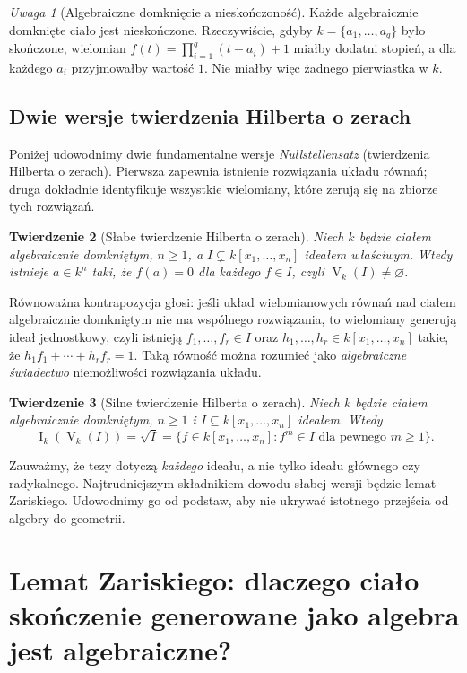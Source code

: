 \documentclass[11pt,a4paper,openany]{report}
\numberwithin{equation}{section}
\theoremstyle{plain}
\newtheorem{twierdzenie}{Twierdzenie}[section]
\theoremstyle{definition}
\theoremstyle{remark}
\newtheorem{uwaga}[twierdzenie]{Uwaga}
\newcommand{\V}{\operatorname V}
\newcommand{\I}{\operatorname I}
\begin{document}
\begin{uwaga}[Algebraiczne domknięcie a nieskończoność]
Każde algebraicznie domknięte ciało jest nieskończone.
Rzeczywiście, gdyby $k=\{a_1,\dots,a_q\}$ było skończone,
wielomian $f(t)=\prod_{i=1}^q(t-a_i)+1$ miałby dodatni stopień,
a dla każdego $a_i$ przyjmowałby wartość $1$.
Nie miałby więc żadnego pierwiastka w $k$.
\end{uwaga}

\subsection{Dwie wersje twierdzenia Hilberta o zerach}

Poniżej udowodnimy dwie fundamentalne wersje
\emph{Nullstellensatz} (twierdzenia Hilberta o zerach).
Pierwsza zapewnia istnienie rozwiązania układu równań;
druga dokładnie identyfikuje wszystkie wielomiany, które
zerują się na zbiorze tych rozwiązań.

\begin{twierdzenie}[Słabe twierdzenie Hilberta o zerach]
\label{tw:weak-NS}
Niech $k$ będzie ciałem algebraicznie domkniętym,
$n\ge1$, a $I\subsetneq k[x_1,\dots,x_n]$ ideałem właściwym.
Wtedy istnieje $a\in k^n$ taki, że $f(a)=0$ dla każdego $f\in I$,
czyli $\V_k(I)\ne\varnothing$.
\end{twierdzenie}

Równoważna kontrapozycja głosi: jeśli układ wielomianowych
równań nad ciałem algebraicznie domkniętym nie ma wspólnego
rozwiązania, to wielomiany generują ideał jednostkowy, czyli
istnieją $f_1,\dots,f_r\in I$ oraz
$h_1,\dots,h_r\in k[x_1,\dots,x_n]$ takie, że
$h_1f_1+\cdots+h_rf_r=1$.
Taką równość można rozumieć jako \emph{algebraiczne świadectwo}
niemożliwości rozwiązania układu.

\begin{twierdzenie}[Silne twierdzenie Hilberta o zerach]
\label{tw:strong-NS}
Niech $k$ będzie ciałem algebraicznie domkniętym,
$n\ge1$ i $I\subseteq k[x_1,\dots,x_n]$ ideałem.
Wtedy
\[
\I_k(\V_k(I))=\sqrt I
=\{f\in k[x_1,\dots,x_n]:f^m\in I\text{ dla pewnego }m\ge1\}.
\]
\end{twierdzenie}

Zauważmy, że tezy dotyczą \emph{każdego} ideału,
a nie tylko ideału głównego czy radykalnego. Najtrudniejszym
składnikiem dowodu słabej wersji będzie lemat Zariskiego.
Udowodnimy go od podstaw, aby nie ukrywać istotnego przejścia
od algebry do geometrii.

\section{Lemat Zariskiego: dlaczego ciało skończenie generowane jako algebra jest algebraiczne?}
\end{document}
